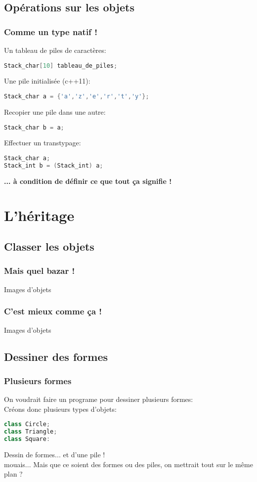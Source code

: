 \documentclass{beamer}
\begin{document}
\subsection {Opérations sur les objets}

\begin{frame}[fragile=singleslide,shrink=20]
\frametitle{Comme un type natif !}
Un tableau de piles de caractères:
\begin{lstlisting}[language=c++]
Stack_char[10] tableau_de_piles;
\end{lstlisting}
Une pile initialisée (c++11):
\begin{lstlisting}[language=c++]
Stack_char a = {'a','z','e','r','t','y'};
\end{lstlisting}
Recopier une pile dans une autre:
\begin{lstlisting}[language=c++]
Stack_char b = a;
\end{lstlisting}
Effectuer un transtypage:
\begin{lstlisting}[language=c++]
Stack_char a;
Stack_int b = (Stack_int) a;
\end{lstlisting}
\textbf{... à condition de définir ce que tout ça signifie !}
\end{frame}

\section{L'héritage}
\subsection {Classer les objets}

\begin{frame}[fragile=singleslide,shrink=20]
\frametitle{Mais quel bazar !}
Images d'objets
\end{frame}

\begin{frame}[fragile=singleslide,shrink=20]
\frametitle{C'est mieux comme ça !}
Images d'objets
\end{frame}

\subsection{Dessiner des formes}
\begin{frame}[fragile=singleslide,shrink=20]
\frametitle{Plusieurs formes}
On voudrait faire un programe pour dessiner plusieurs formes: \\
Créons donc plusieurs types d'objets:
\begin{lstlisting}[language=c++]
class Circle;
class Triangle;
class Square:
\end{lstlisting}
Dessin de formes... et d'une pile ! \\
mouais... Mais que ce soient des formes ou des piles, on mettrait tout sur le même plan ?
\end{frame}
\end{document}
